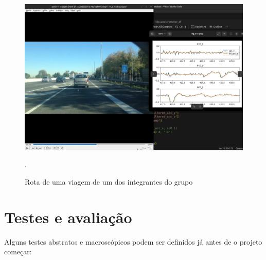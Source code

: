 \begin{figure}[hp]
    \centering
    
    \includegraphics[scale=0.3]{figures/rota_integrante.jpg}
    
    \caption{Rota de uma viagem de um dos integrantes do grupo}.
    \label{fig:rota1integrante}
\end{figure}

\section{Testes e avaliação}
Alguns testes abstratos e macroscópicos podem ser definidos já antes de o projeto começar:

